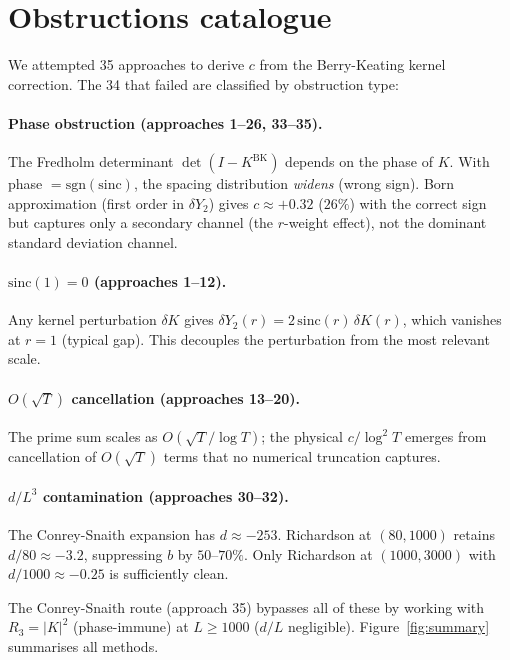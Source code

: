 \documentclass[11pt]{article}
\begin{document}
\section{Obstructions catalogue}
\label{sec:obstructions}

We attempted 35 approaches to derive $c$ from the Berry-Keating kernel
correction. The 34 that failed are classified by obstruction type:

\paragraph{Phase obstruction (approaches 1--26, 33--35).}
The Fredholm determinant $\det(I - K^{\mathrm{BK}})$ depends on the phase of
$K$. With phase $= \mathrm{sgn}(\mathrm{sinc})$, the spacing distribution
\emph{widens} (wrong sign). Born approximation (first order in $\delta Y_2$)
gives $c \approx +0.32$ ($26\%$) with the correct sign but captures only
a secondary channel (the $r$-weight effect), not the dominant standard
deviation channel.

\paragraph{$\mathrm{sinc}(1) = 0$ (approaches 1--12).}
Any kernel perturbation $\delta K$ gives $\delta Y_2(r) = 2\,\mathrm{sinc}(r)\,\delta K(r)$,
which vanishes at $r = 1$ (typical gap). This decouples the perturbation
from the most relevant scale.

\paragraph{$O(\sqrt{T})$ cancellation (approaches 13--20).}
The prime sum scales as $O(\sqrt{T}/\log T)$; the physical $c/\log^2 T$
emerges from cancellation of $O(\sqrt{T})$ terms that no numerical
truncation captures.

\paragraph{$d/L^3$ contamination (approaches 30--32).}
The Conrey-Snaith expansion has $d \approx -253$. Richardson at $(80, 1000)$
retains $d/80 \approx -3.2$, suppressing $b$ by $50$--$70\%$. Only
Richardson at $(1000, 3000)$ with $d/1000 \approx -0.25$ is sufficiently clean.

The Conrey-Snaith route (approach 35) bypasses all of these by working
with $R_3 = |K|^2$ (phase-immune) at $L \geq 1000$ ($d/L$ negligible).
Figure~\ref{fig:summary} summarises all methods.
\end{document}
